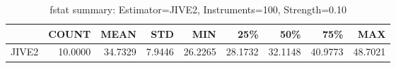 \begin{table}[ht]
\centering
\caption{fstat summary: Estimator=JIVE2, Instruments=100, Strength=0.10}
\begin{tabular}{lrrrrrrrr}
\toprule
 & COUNT & MEAN & STD & MIN & 25\% & 50\% & 75\% & MAX \\
\midrule
JIVE2 & 10.0000 & 34.7329 & 7.9446 & 26.2265 & 28.1732 & 32.1148 & 40.9773 & 48.7021 \\
\bottomrule
\end{tabular}
\end{table}
